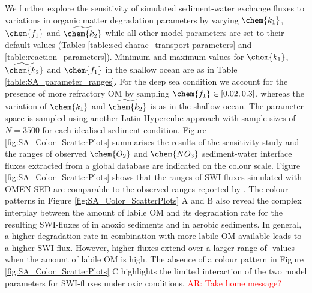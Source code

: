 \documentclass[gmd, manuscript]{copernicus}
\begin{document}
We further explore the sensitivity of simulated sediment-water exchange fluxes to variations in organic matter degradation parameters by varying $\chem{k_1}$, $\chem{f_1}$ and $\widetilde{\chem{k_2}}$ while all other model 
parameters are set to their default values (Tables \ref{table:sed-charac_transport-parameters} and \ref{table:reaction_parameters}). Minimum and maximum values for $\chem{k_1}$, $\widetilde{\chem{k_2}}$ and $\chem{f_1}$ in 
the shallow ocean are as in Table \ref{table:SA_parameter_ranges}. 
For the deep sea condition we account for the presence of more refractory OM by sampling $\chem{f_1} \in [0.02, 0.3]$, whereas the variation of $\chem{k_1}$ and $\widetilde{\chem{k_2}}$ is as in the shallow ocean. 
The parameter space is sampled using another Latin-Hypercube approach with sample sizes of $N=3500$ for each idealised sediment condition. 
Figure \ref{fig:SA_Color_ScatterPlots} summarises the results of the sensitivity study and the ranges of observed $\chem{O_2}$ and $\chem{NO_3}$ sediment-water interface 
fluxes extracted from a global database \citep{stolpovsky_toward_2015} are indicated on the colour scale. 
Figure \ref{fig:SA_Color_ScatterPlots} shows that the ranges of SWI-fluxes simulated with OMEN-SED are comparable to the observed ranges reported by \citet{stolpovsky_toward_2015}. 
The colour patterns in Figure \ref{fig:SA_Color_ScatterPlots} A and B also reveal the complex interplay between the amount of labile OM  and its degradation rate  for the resulting SWI-fluxes 
of  in anoxic sediments and  in aerobic sediments. 
In general, a higher degradation rate in combination with more labile OM available leads to a higher SWI-flux. 
However, higher fluxes extend over a larger range of -values when the amount of labile OM  is high. 
The absence of a colour pattern in Figure \ref{fig:SA_Color_ScatterPlots} C highlights the limited interaction of the two model parameters for  SWI-fluxes under oxic conditions. 
\textcolor{red}{AR: Take home message?}
\end{document}
